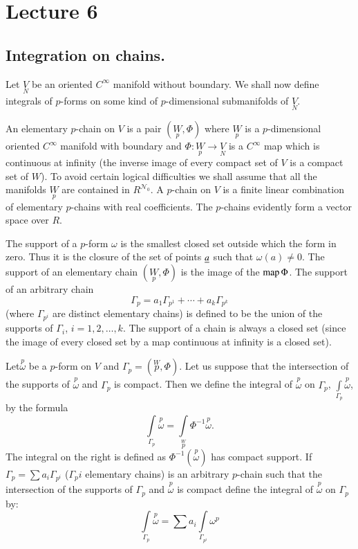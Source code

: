 \chapter{Lecture 6}

\section*{Integration on chains.}\pageoriginale

Let $\underset{N}{V}$ be an oriented $C^{\infty}$ manifold without
boundary. We shall now define integrals of $p$-forms on some kind of
$p$-dimen\-sional submanifolds of $\underset{N}{V}$.

An elementary $p$-chain on $V$ is a pair $(\underset{p}{W},\Phi)$
where $\underset{p}{W}$ is a $p$-dimen\-sional oriented $C^{\infty}$
manifold with boundary and $\Phi:\underset{p}{W}\to\underset{N}{V}$ is
a $C^{\infty}$ map which is continuous at infinity (\iec the inverse
image of every compact set of $V$ is a compact set of $W$). To avoid
certain logical difficulties we shall assume that all the manifolds
$\underset{p}{W}$ are contained in $R^{\mathscr{N}_{0}}$. A $p$-chain
on $V$ is a finite linear combination of elementary $p$-chains with
real coefficients. The $p$-chains evidently form a vector space over
$R$.

The support of a $p$-form $\omega$ is the smallest closed set outside
which the form in zero. Thus it is the closure of the set of points
$\underline{a}$ such that $\omega(a)\neq 0$. The support of an elementary
chain $(\underset{p}{W},\Phi)$ is the image of the $\operatorname{map} \Phi$. The
support of an arbitrary chain 
$$
\Gamma_{p}=a_{1}\Gamma_{p^{1}}+\cdots+a_{k}\Gamma_{p^{k}}
$$
(where $\Gamma_{p^{i}}$ are distinct elementary chains) is defined to
be the union of the supports of $\Gamma_{i}$, $i=1,2,\ldots,k$. The
support of a chain is always a closed set (since the image of every
closed set by a map continuous at infinity is a closed set).

Let\pageoriginale $\overset{p}{\omega}$ be a $p$-form on $V$ and
$\Gamma_{p}=\left(\overset{W}{p},\Phi\right)$. Let us suppose that the
intersection of the supports of $\overset{p}{\omega}$ and $\Gamma_{p}$
is compact. Then we define the integral of $\overset{p}{\omega}$ on
$\Gamma_{p}$, $\int\limits_{\Gamma_{p}}\overset{p}{\omega}$, by the
formula
$$
\int\limits_{\Gamma_{p}}\overset{p}{\omega}=\int\limits_{\overset{W}{p}}
\Phi^{-1}\overset{p}{\omega}.   
$$
The integral on the right is defined as
$\Phi^{-1}(\overset{p}{\omega})$ has compact support. If
$\Gamma_{p}=\sum a_{i}\Gamma_{p^{i}}$ ($\Gamma_{p}i$ elementary
chains) is an arbitrary $p$-chain such that the intersection of the
supports of $\Gamma_{p}$ and $\overset{p}{\omega}$ is compact define
the integral of $\overset{p}{\omega}$ on $\Gamma_{p}$ by:
$$
\int\limits_{\Gamma_{p}}\overset{p}{\omega}=\sum
a_{i}\int\limits_{\Gamma_{p^{i}}}\omega^{p}
$$

